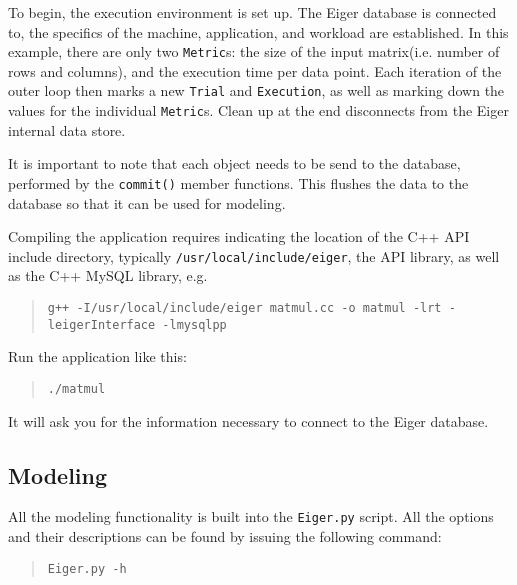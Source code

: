 To begin, the execution environment is set up. The Eiger database is connected to, the specifics of the machine, application, and workload are established. In this example, there are only two \texttt{Metric}s: the size of the input matrix(i.e. number of rows and columns), and the execution time per data point. Each iteration of the outer loop then marks a new \texttt{Trial} and \texttt{Execution}, as well as marking down the values for the individual \texttt{Metric}s. Clean up at the end disconnects from the Eiger internal data store.

It is important to note that each object needs to be send to the database, performed by the \texttt{commit()} member functions. This flushes the data to the database so that it can be used for modeling.

Compiling the application requires indicating the location of the C++ API include directory, typically \texttt{/usr/local/include/eiger}, the API library, as well as the C++ MySQL library, e.g.
	\begin{quote}
	\texttt{g++ -I/usr/local/include/eiger matmul.cc -o matmul -lrt -leigerInterface -lmysqlpp}
	\end{quote}

Run the application like this:
	\begin{quote}
	\texttt{./matmul}
	\end{quote}
It will ask you for the information necessary to connect to the Eiger database.

\subsection{Modeling}
All the modeling functionality is built into the \texttt{Eiger.py} script. All the options and their descriptions can be found by issuing the following command: 
	\begin{quote}
	\texttt{Eiger.py -h}
	\end{quote}

